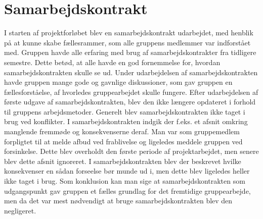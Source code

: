 \section{Samarbejdskontrakt}
I starten af projektforløbet blev en samarbejdskontrakt udarbejdet, med henblik på at kunne skabe fællesrammer, som alle gruppens medlemmer var indforstået med.
Gruppen havde alle erfaring med brug af samarbejdskontrakter fra tidligere semestre. Dette betød, at alle havde en god fornemmelse for, hvordan 
samarbejdskontrakten skulle se ud. Under udarbejdelsen af samarbejdskontrakten havde gruppen mange gode og gavnlige diskussioner, som gav gruppen en 
fællesforståelse, af hvorledes gruppearbejdet skulle fungere. 
Efter udarbejdelsen af første udgave af samarbejdskontrakten, blev den ikke længere opdateret i forhold til gruppens arbejdsmetoder. Generelt blev 
samarbejdskontrakten ikke taget i brug ved konflikter. I samarbejdskontrakten indgik der f.eks. et afsnit omkring manglende fremmøde og konsekvenserne deraf. 
Man var som gruppemedlem forpligtet til at melde afbud ved frablivelse og ligeledes meddele gruppen ved forsinkelse. Dette blev overholdt den første periode 
af projektarbejdet, men senere blev dette afsnit ignoreret. I samarbejdskontrakten blev der beskrevet hvilke konsekvenser en sådan forseelse bør munde ud i, 
men dette blev ligeledes heller ikke taget i brug. 
Som konklusion kan man sige at samarbejdskontrakten som udgangspunkt gav gruppen et fælles grundlag for det fremtidige gruppearbejde, men da det var mest
 nødvendigt at bruge samarbejdskontrakten blev den negligeret.
